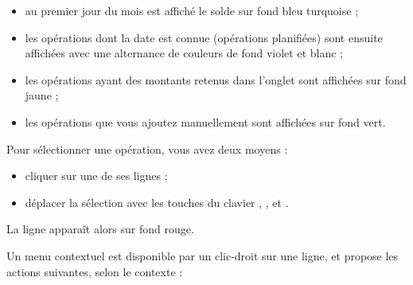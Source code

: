 \begin{itemize}
	 \item au premier jour du mois est affiché le solde sur fond bleu turquoise{\couleur} ;
	 \item les opérations dont la date est connue (opérations planifiées) sont ensuite affichées avec une alternance de couleurs de fond violet et blanc{\couleurs} ;
	 \item les opérations ayant des montants retenus dans l'onglet  sont affichées sur fond  jaune{\couleur} ;
	 \item les opérations que vous ajoutez manuellement sont affichées sur fond vert{\couleur}.
\end{itemize}

Pour sélectionner une opération, vous avez deux moyens :
\begin{itemize}
	 \item cliquer sur une de ses lignes ;
	 \item déplacer la sélection avec les touches du clavier , ,  et .
\end{itemize}
La ligne apparaît alors sur fond rouge{\couleur}.

Un menu contextuel est disponible par un clic-droit sur une ligne, et propose les actions suivantes, selon le contexte :

